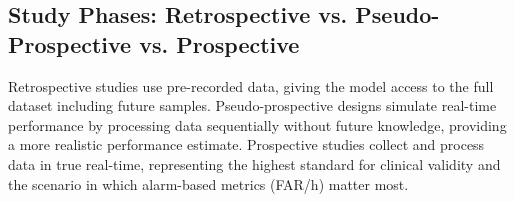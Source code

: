 \subsection{Study Phases: Retrospective vs. Pseudo-Prospective vs. Prospective}
Retrospective studies use pre-recorded data, giving the model access to the full dataset including future samples. 
Pseudo-prospective designs simulate real-time performance by processing data sequentially without future knowledge, 
providing a more realistic performance estimate. Prospective studies collect and 
process data in true real-time, representing the highest standard for clinical validity and 
the scenario in which alarm-based metrics (FAR/h) matter most.
